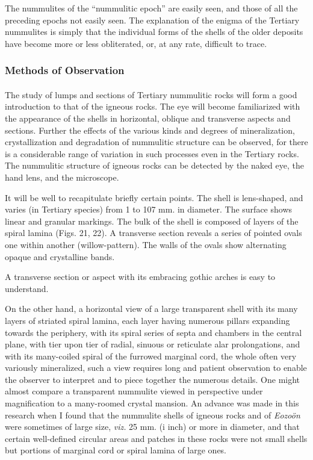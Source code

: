 \documentclass[a4paper, 12pt, oneside]{article}
\begin{document}
The nummulites of the ``nummulitic epoch'' are easily seen, and those of all the preceding epochs not easily seen. The explanation of the enigma of the Tertiary nummulites is simply that the individual forms of the shells of the older deposits have become more or less obliterated, or, at any rate, difficult to trace.

\subsubsection{Methods of Observation}
\paragraph{}
The study of lumps and sections of Tertiary nummulitic rocks will form a good introduction to that of the igneous rocks. The eye will become familiarized with the appearance of the shells in horizontal, oblique and transverse aspects and sections. Further the effects of the various kinds and degrees of mineralization, crystallization and degradation of nummulitic structure can be observed, for there is a considerable range of variation in such processes even in the Tertiary rocks. The nummulitic structure of igneous rocks can be detected by the naked eye, the hand lens, and the microscope.

It will be well to recapitulate briefly certain points. The shell is lens-shaped, and varies (in Tertiary species) from 1 to 107 mm. in diameter. The surface shows linear and granular markings. The bulk of the shell is composed of layers of the spiral lamina (Figs. 21, 22). A transverse section reveals a series of pointed ovals one within another (willow-pattern). The walls of the ovals show alternating opaque and crystalline bands.

A transverse section or aspect with its embracing gothic arches is easy to understand.

On the other hand, a horizontal view of a large transparent shell with its many layers of striated spiral lamina, each layer having numerous pillars expanding towards the periphery, with its spiral series of septa and chambers in the central plane, with tier upon tier of radial, sinuous or reticulate alar prolongations, and with its many-coiled spiral of the furrowed marginal cord, the whole often very variously mineralized, such a view requires long and patient observation to enable the observer to interpret and to piece together the numerous details. One might almost compare a transparent nummulite viewed in perspective under magnification to a many-roomed crystal mansion. An advance was made in this research when I found that the nummulite shells of igneous rocks and of \emph{Eozoön} were sometimes of large size, \emph{viz.} 25 mm. (i inch) or more in diameter, and that certain well-defined circular areas and patches in these rocks were not small shells but portions of marginal cord or spiral lamina of large ones.
\end{document}
